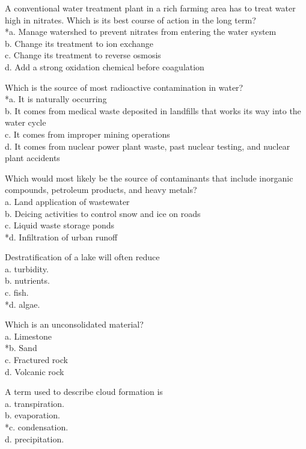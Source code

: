   \item A conventional water treatment plant in a rich farming area has to treat water high in nitrates. Which is its best course of action in the long term?\\
*a. Manage watershed to prevent nitrates from entering the water system\\
b. Change its treatment to ion exchange\\
c. Change its treatment to reverse osmosis\\
d. Add a strong oxidation chemical before coagulation\\


  \item Which is the source of most radioactive contamination in water?\\
*a. It is naturally occurring\\
b. It comes from medical waste deposited in landfills that works its way into the water cycle\\
c. It comes from improper mining operations\\
d. It comes from nuclear power plant waste, past nuclear testing, and nuclear plant accidents\\

  \item Which would most likely be the source of contaminants that include inorganic compounds, petroleum products, and heavy metals?\\
a. Land application of wastewater\\
b. Deicing activities to control snow and ice on roads\\
c. Liquid waste storage ponds\\
*d. Infiltration of urban runoff 

  \item Destratification of a lake will often reduce\\
a. turbidity.\\
b. nutrients.\\
c. fish.\\
*d. algae.


  \item Which is an unconsolidated material?\\
a. Limestone\\
*b. Sand\\
c. Fractured rock\\
d. Volcanic rock\\


  \item A term used to describe cloud formation is\\
a. transpiration.\\
b. evaporation.\\
*c. condensation.\\
d. precipitation.\\


